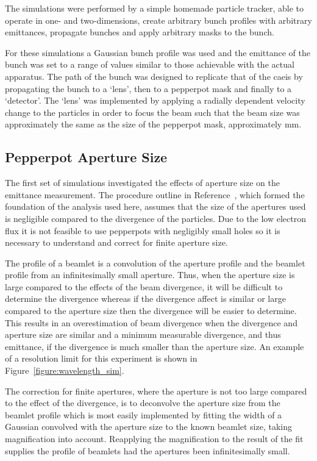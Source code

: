 The simulations were performed by a simple homemade particle tracker, able to operate in one- and two-dimensions, create arbitrary bunch profiles with arbitrary emittances, propagate bunches and apply arbitrary masks to the bunch.

For these simulations a Gaussian bunch profile was used and the emittance of the bunch was set to a range of values similar to those achievable with the actual apparatus.
The path of the bunch was designed to replicate that of the \gls{caeis} by propagating the bunch to a `lens', then to a pepperpot mask and finally to a `detector'.
The `lens' was implemented by applying a radially dependent velocity change to the particles in order to focus the beam such that the beam size was approximately the same as the size of the pepperpot mask, approximately \unit[2]{mm}.

\subsection{Pepperpot Aperture Size}

The first set of simulations investigated the effects of aperture size on the emittance measurement.
The procedure outline in Reference~\cite{zhang_emittance_1996}, which formed the foundation of the analysis used here, assumes that the size of the apertures used is negligible compared to the divergence of the particles.
Due to the low electron flux it is not feasible to use pepperpots with negligibly small holes so it is necessary to understand and correct for finite aperture size.

The profile of a beamlet is a convolution of the aperture profile and the beamlet profile from an infinitesimally small aperture.
Thus, when the aperture size is large compared to the effects of the beam divergence, it will be difficult to determine the divergence whereas if the divergence affect is similar or large compared to the aperture size then the divergence will be easier to determine.
This results in an overestimation of beam divergence when the divergence and aperture size are similar and a minimum measurable divergence, and thus emittance, if the divergence is much smaller than the aperture size.
An example of a resolution limit for this experiment is shown in Figure~\ref{figure:wavelength_sim}.

The correction for finite apertures, where the aperture is not too large compared to the effect of the divergence, is to deconvolve the aperture size from the beamlet profile which is most easily implemented by fitting the width of a Gaussian convolved with the aperture size to the known beamlet size, taking magnification into account.
Reapplying the magnification to the result of the fit supplies the profile of beamlets had the apertures been infinitesimally small.

